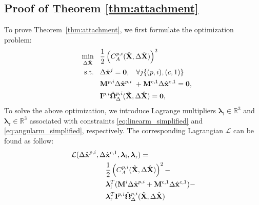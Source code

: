 \subsection{Proof of Theorem \ref{thm:attachment}}
\label{appendix:theorem_junction1}
To prove Theorem~\ref{thm:attachment}, we first formulate the optimization problem:
\begin{align}
    & &\underset{\Delta \hat{\mathbf{X}}}{\min}& \hspace{0.3cm} \frac{1}{2}\left(C^{p,i}_A(\hat{\mathbf{X}}, \Delta \hat{\mathbf{X}})\right)^2  
    \label{eq:optimization_simplified_attachement}\\
    &&\text{s.t.} &\hspace{0.3cm}  \Delta \hat{\mathbf{x}}^j = \mathbf{0}, \hspace{0.3cm} \forall j  \{(p, i),(c, 1)\} 
    \label{eq:index_selection}\\
    && & \hspace{0.3cm}   \mathbf{M}^{p, i}  \Delta \hat{\mathbf{x}}^{p, i}\ + \mathbf{M}^{c, 1}  \Delta \hat{\mathbf{x}}^{c, 1}= \mathbf{0}, 
    \label{eq:linearm_simplified} \\
    && &\hspace{0.3cm} 
    \mathbf{I}^{p, i}   \hat{\boldsymbol{\Omega}}^{p, i} _\Delta (\hat{\mathbf{X}},\Delta \hat{\mathbf{X}} ) = \mathbf{0},
    \label{eq:angularm_simplified} 
\end{align}
To solve the above optimization, we introduce Lagrange multipliers $\boldsymbol{\lambda}_\text{l} \in \mathbb{R}^{3}$ and $\boldsymbol{\lambda}_\text{r} \in \mathbb{R}^{3}$ associated with constraints \eqref{eq:linearm_simplified} and \eqref{eq:angularm_simplified}, respectively.
The corresponding Lagrangian $\mathcal{L}$  can be found as follow:
 \begin{align}
    \begin{split}
    \mathcal{L}(\Delta \hat{\textbf{x}}^{p, i}, \Delta & \hat{\mathbf{x}}^{c,1},  \boldsymbol{\lambda}_\text{l}, \boldsymbol{\lambda}_\text{r}) = \\
    &\frac{1}{2}\left(C^{p,i}_A(\hat{\mathbf{X}}, \Delta \hat{\mathbf{X}})\right)^2- \\
    & \boldsymbol{\lambda}^T_\text{l}(\mathbf{M}^i  \Delta \hat{\textbf{x}}^{p, i} + \mathbf{M}^{c, 1}  \Delta \hat{\mathbf{x}}^{c,1})- \\
    & \boldsymbol{\lambda}^T_\text{r}\mathbf{I}^{p, i}   \hat{\boldsymbol{\Omega}}^{p, i} _\Delta (\hat{\mathbf{X}},\Delta \hat{\mathbf{X}} )
    \label{eq:attachment_lag} 
    \end{split}
\end{align}
